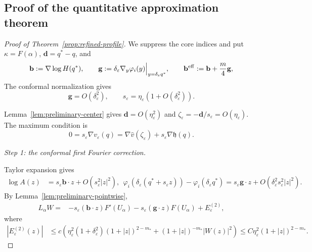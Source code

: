 \documentclass[11pt,reqno]{amsart}
\numberwithin{equation}{section}
\theoremstyle{definition}
\theoremstyle{remark}
\newcommand{\eps}{\varepsilon}
\newcommand{\etae}{\eta_{\eps}}
\newcommand{\de}{\delta_{\eps}}
\begin{document}
\subsection{Proof of the quantitative approximation theorem}
\label{app:pointwise-proof}

\begin{proof}[Proof of Theorem~\ref{prop:refined-profile}]
We suppress the core indices and put $\kappa=F(\alpha)$,
$\mathbf{d}=q^*-q$, and
{ 
\begin{equation}
  \mathbf{b}:=\nabla\log H(q^*),
  \qquad
  \mathbf{g}:=\de\nabla_y\varphi_i(y)\Big|_{y=\de q^*},
  \qquad
  \mathbf{b}^{\rm eff}:=\mathbf{b}+\frac m4\mathbf{g},
  \label{eq:b-g-effective}
\end{equation}
}
The conformal normalization gives
\begin{equation}
  \mathbf{g}=O(\de^2),
  \qquad
  s_\eps=\etae(1+O(\de^2)).
  \label{eq:s-g-size}
\end{equation}

Lemma~\ref{lem:preliminary-center} gives $\mathbf{d}=O(\etae^2)$ and
$\zeta_\eps=-\mathbf{d}/s_\eps=O(\etae)$. The maximum condition is
\begin{equation}
  0
  =
  s_\eps\nabla v_\eps(q)
  =
  \nabla\widehat v(\zeta_\eps)
  +s_\eps\nabla\mathfrak h(q).
  \label{eq:max-condition-scaled}
\end{equation}

\medskip
\noindent
{ 
\emph{Step 1: the conformal first Fourier correction.}
}

Taylor expansion gives
{ 
\begin{align}
  \log A(z)
  &=
  s_\eps \mathbf{b}\cdot z
  +O(s_\eps^2|z|^2),
  \ \
  \varphi_i(\de(q^*+s_\eps z))
  -\varphi_i(\de q^*)
  =
  s_\eps \mathbf{g}\cdot z
  +O(\de^2s_\eps^2|z|^2).
  \label{eq:conformal-first}
\end{align}
}
By Lemma~\ref{lem:preliminary-pointwise},
{ 
\begin{align}
  L_\alpha W
  ={}&
  -s_\eps(\mathbf{b}\cdot z)F'(U_\alpha)
  -s_\eps(\mathbf{g}\cdot z)F(U_\alpha)
  +E_\eps^{(2)},
  \label{eq:W-first-decomposition}
\end{align}
}
where \begin{equation}
\begin{aligned}
  |E_\eps^{(2)}(z)|
  &\le 
  c\left(\eta_\eps^2(1+\de^2)
  (1+|z|)^{2-m_*}
 +
  (1+|z|)^{-m_*}|W(z)|^2\right)  \le C \eta_\eps^2
  (1+|z|)^{2-m_*}.
  \label{eq:E2-crude}
\end{aligned}\end{equation}


\end{proof}
\end{document}
